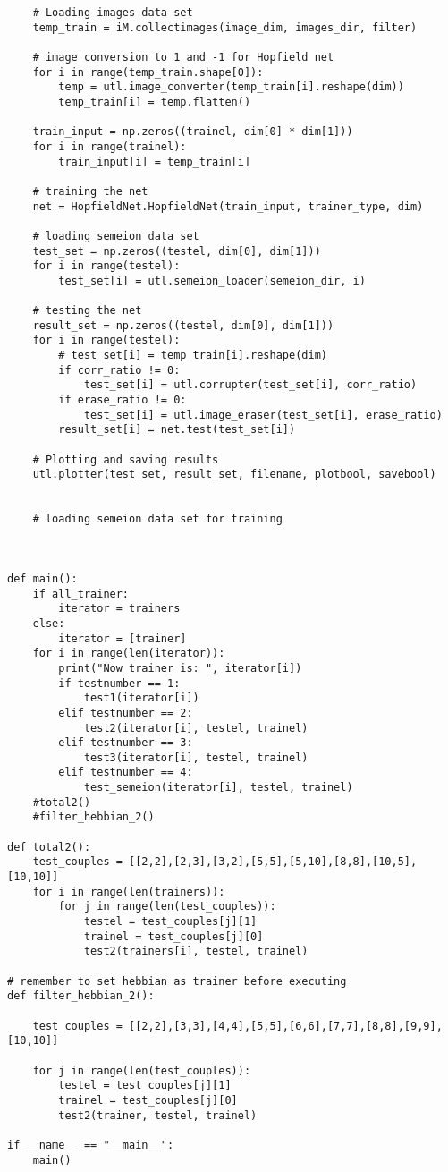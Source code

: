 \documentclass[letterpaper,twocolumn,10pt]{article}
\begin{document}
\begin{lstlisting}
    # Loading images data set
    temp_train = iM.collectimages(image_dim, images_dir, filter)

    # image conversion to 1 and -1 for Hopfield net
    for i in range(temp_train.shape[0]):
        temp = utl.image_converter(temp_train[i].reshape(dim))
        temp_train[i] = temp.flatten()

    train_input = np.zeros((trainel, dim[0] * dim[1]))
    for i in range(trainel):
        train_input[i] = temp_train[i]

    # training the net
    net = HopfieldNet.HopfieldNet(train_input, trainer_type, dim)

    # loading semeion data set
    test_set = np.zeros((testel, dim[0], dim[1]))
    for i in range(testel):
        test_set[i] = utl.semeion_loader(semeion_dir, i)

    # testing the net
    result_set = np.zeros((testel, dim[0], dim[1]))
    for i in range(testel):
        # test_set[i] = temp_train[i].reshape(dim)
        if corr_ratio != 0:
            test_set[i] = utl.corrupter(test_set[i], corr_ratio)
        if erase_ratio != 0:
            test_set[i] = utl.image_eraser(test_set[i], erase_ratio)
        result_set[i] = net.test(test_set[i])

    # Plotting and saving results
    utl.plotter(test_set, result_set, filename, plotbool, savebool)


    # loading semeion data set for training



def main():
    if all_trainer:
        iterator = trainers
    else:
        iterator = [trainer]
    for i in range(len(iterator)):
        print("Now trainer is: ", iterator[i])
        if testnumber == 1:
            test1(iterator[i])
        elif testnumber == 2:
            test2(iterator[i], testel, trainel)
        elif testnumber == 3:
            test3(iterator[i], testel, trainel)
        elif testnumber == 4:
            test_semeion(iterator[i], testel, trainel)
    #total2()
    #filter_hebbian_2()

def total2():
    test_couples = [[2,2],[2,3],[3,2],[5,5],[5,10],[8,8],[10,5],[10,10]]
    for i in range(len(trainers)):
        for j in range(len(test_couples)):
            testel = test_couples[j][1]
            trainel = test_couples[j][0]
            test2(trainers[i], testel, trainel)

# remember to set hebbian as trainer before executing
def filter_hebbian_2():

    test_couples = [[2,2],[3,3],[4,4],[5,5],[6,6],[7,7],[8,8],[9,9],[10,10]]

    for j in range(len(test_couples)):
        testel = test_couples[j][1]
        trainel = test_couples[j][0]
        test2(trainer, testel, trainel)

if __name__ == "__main__":
    main()
\end{lstlisting}



\end{document}

